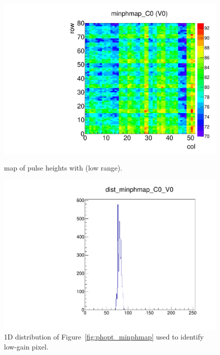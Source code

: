 \begin{figure}[!htp]
\centering
\begin{minipage}{0.45\textwidth}
  \includegraphics[width=1.0\textwidth]{figures/phopt_minphmap.pdf}
  \caption{\roc map of pulse heights with  (low range).}
  \label{fig:phopt_minphmap}
\end{minipage}
\hspace{0.3cm}
\begin{minipage}{0.45\textwidth}
  \includegraphics[width=1.0\textwidth]{figures/phopt_dist_minphmap.pdf}
  \caption{1D distribution of Figure~\ref{fig:phopt_minphmap}
           used to identify low-gain pixel.}
  \label{fig:phopt_dist_minphmap}
\end{minipage}
\end{figure}

